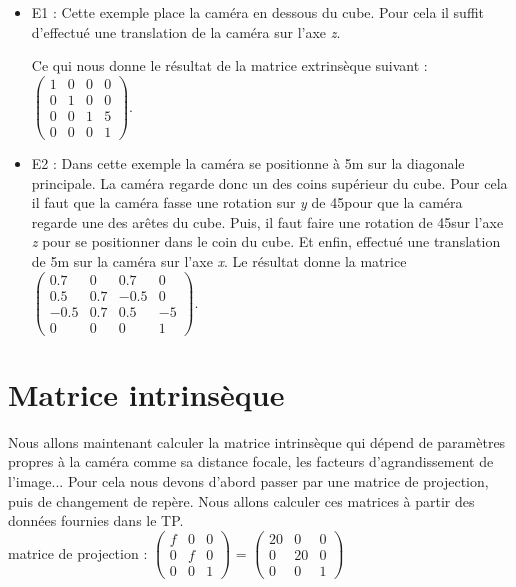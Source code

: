 \documentclass[a4paper,11pt]{article}
\begin{document}
  \begin{itemize}
   \item E1 : Cette exemple place la caméra en dessous du cube. Pour cela il suffit
   d'effectué une translation de la caméra sur l'axe \textit{z}. 
  
   Ce qui nous donne le résultat de la matrice extrinsèque suivant :
    $\begin{pmatrix}
      1 & 0 & 0 & 0\\
      0 & 1 & 0 & 0\\
      0 & 0 & 1 & 5\\
      0 & 0 & 0 & 1
      \end{pmatrix}$.
   \item E2 : Dans cette exemple la caméra se positionne à 5m sur la diagonale principale.
   La caméra regarde donc un des coins supérieur du cube. Pour cela il faut que la caméra 
   fasse une rotation sur \textit{y} de 45\degre pour que la caméra regarde une des arêtes du cube. Puis,
   il faut faire une rotation de 45\degre sur l'axe \textit{z} pour se positionner dans le coin du cube. 
   Et enfin, effectué une translation de 5m sur la caméra sur l'axe \textit{x}. Le résultat donne la matrice
   $\begin{pmatrix}
      0.7 & 0 & 0.7 & 0\\
      0.5 & 0.7 & -0.5 & 0\\
      -0.5 & 0.7 & 0.5 & -5\\
      0 & 0 & 0 & 1
      \end{pmatrix}$.
  \end{itemize}
  
  
  \section{Matrice intrinsèque}
  
  Nous allons maintenant calculer la matrice intrinsèque qui dépend de paramètres propres à la caméra comme sa 
  distance focale, les facteurs d'agrandissement de l'image... Pour cela nous devons d'abord passer par une matrice 
  de projection, puis de changement de repère. Nous allons calculer ces matrices à partir des données fournies dans le TP.\\
  
  matrice de projection : 
   $\begin{pmatrix}
     f & 0 & 0\\  
     0 & f & 0\\  
     0 & 0 & 1 
     \end{pmatrix}$ = 
   $\begin{pmatrix}
     20 & 0 & 0\\  
     0 & 20 & 0\\  
     0 & 0 & 1 
     \end{pmatrix}$\\
     
\end{document}
